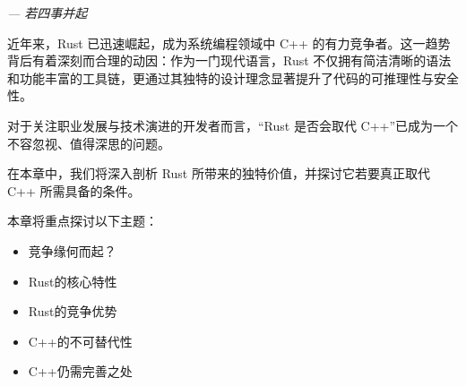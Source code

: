 
\begin{flushright}
\textit{--- 若四事并起}
\end{flushright}

近年来，Rust 已迅速崛起，成为系统编程领域中 C++ 的有力竞争者。这一趋势背后有着深刻而合理的动因：作为一门现代语言，Rust 不仅拥有简洁清晰的语法和功能丰富的工具链，更通过其独特的设计理念显著提升了代码的可推理性与安全性。

对于关注职业发展与技术演进的开发者而言，“Rust 是否会取代 C++”已成为一个不容忽视、值得深思的问题。

在本章中，我们将深入剖析 Rust 所带来的独特价值，并探讨它若要真正取代 C++ 所需具备的条件。

本章将重点探讨以下主题：

\begin{itemize}
\item 
竞争缘何而起？

\item 
Rust的核心特性

\item 
Rust的竞争优势

\item 
C++的不可替代性

\item 
C++仍需完善之处
\end{itemize}